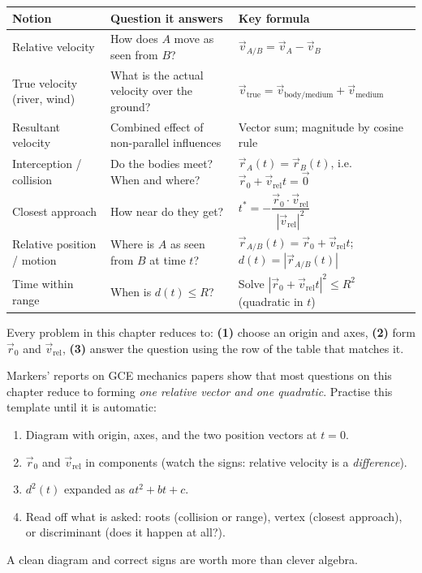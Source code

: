 \documentclass[11pt]{article}
\newcounter{popsec}
\newcounter{popsub}
\newcommand{\courssub}[1]{%
  \stepcounter{popsub}%
  \par\vspace{9pt}\noindent{\popxbold\fontsize{11.5}{13}\selectfont\color{popink}{\color{poporange}\thepopsec.\thepopsub}\hspace{6pt}#1}\par\nopagebreak\vspace{4pt}
}
\begin{document}
\courssub{Chapter Synthesis}

\begin{aretenir}
\begin{center}
\begin{tabularx}{\linewidth}{|l|X|X|}
\hline
\rowcolor{popblueL} \textbf{Notion} & \textbf{Question it answers} & \textbf{Key formula} \\
\hline
Relative velocity & How does $A$ move as seen from $B$? & $\vec{v}_{A/B}=\vec{v}_A-\vec{v}_B$ \\
\hline
True velocity (river, wind) & What is the actual velocity over the ground? & $\vec{v}_{\text{true}}=\vec{v}_{\text{body/medium}}+\vec{v}_{\text{medium}}$ \\
\hline
Resultant velocity & Combined effect of non-parallel influences & Vector sum; magnitude by cosine rule \\
\hline
Interception / collision & Do the bodies meet? When and where? & $\vec{r}_A(t)=\vec{r}_B(t)$, i.e.\ $\vec{r}_0+\vec{v}_{\mathrm{rel}}t=\vec{0}$ \\
\hline
Closest approach & How near do they get? & $t^*=-\dfrac{\vec{r}_0\cdot\vec{v}_{\mathrm{rel}}}{|\vec{v}_{\mathrm{rel}}|^2}$ \\
\hline
Relative position / motion & Where is $A$ as seen from $B$ at time $t$? & $\vec{r}_{A/B}(t)=\vec{r}_0+\vec{v}_{\mathrm{rel}}t$;\quad $d(t)=|\vec{r}_{A/B}(t)|$ \\
\hline
Time within range & When is $d(t)\leq R$? & Solve $|\vec{r}_0+\vec{v}_{\mathrm{rel}}t|^2\leq R^2$ (quadratic in $t$) \\
\hline
\end{tabularx}
\end{center}
Every problem in this chapter reduces to: \textbf{(1)} choose an origin and axes, \textbf{(2)} form $\vec{r}_0$ and $\vec{v}_{\mathrm{rel}}$, \textbf{(3)} answer the question using the row of the table that matches it.
\end{aretenir}

\begin{attention}
Markers' reports on GCE mechanics papers show that most questions on this chapter reduce to forming \emph{one relative vector and one quadratic}. Practise this template until it is automatic:
\begin{enumerate}
\item Diagram with origin, axes, and the two position vectors at $t=0$.
\item $\vec{r}_0$ and $\vec{v}_{\mathrm{rel}}$ in components (watch the signs: relative velocity is a \emph{difference}).
\item $d^2(t)$ expanded as $at^2+bt+c$.
\item Read off what is asked: roots (collision or range), vertex (closest approach), or discriminant (does it happen at all?).
\end{enumerate}
A clean diagram and correct signs are worth more than clever algebra.
\end{attention}
\end{document}
